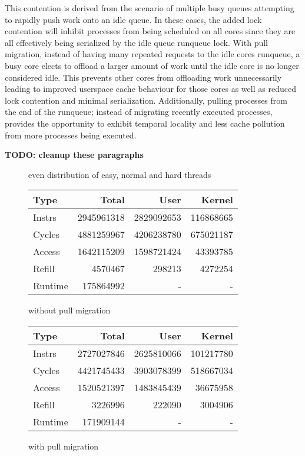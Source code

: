\documentclass[11pt]{article}
\begin{document}
This contention is derived from the scenario of multiple busy queues attempting to rapidly push work onto an idle queue.  In these cases, the added lock contention will inhibit processes from being scheduled on all cores since they are all effectively being serialized by the idle queue runqueue lock.  With pull migration, instead of having many repeated requests to the idle cores runqueue, a busy core elects to offload a larger amount of work until the idle core is no longer considered idle.  This prevents other cores from offloading work unnecessarily leading to improved userspace cache behaviour for those cores as well as reduced lock contention and minimal serialization.  Additionally, pulling processes from the end of the runqueue; instead of migrating recently executed processes, provides the opportunity to exhibit temporal locality and less cache pollution from more processes being executed. 

\textbf{TODO: cleanup these paragraphs}

\begin{figure*}[h]
	\caption{even distribution of easy, normal and hard threads}
	\centering
	\begin{subtable}[b]{.48\linewidth}
		\centering                 
		\begin{tabular}{ l|rrr }
			Type    & Total      & User       & Kernel    \\
			\hline
			Instrs  & 2945961318 & 2829092653 & 116868665 \\ 
			Cycles  & 4881259967 & 4206238780 & 675021187 \\ 
			Access  & 1642115209 & 1598721424 & 43393785  \\ 
			Refill  & 4570467    & 298213     & 4272254   \\ 
			Runtime & 175864992  & -          & -         \\
			\hline
		\end{tabular}
		\caption{without pull migration}    
	\end{subtable}
	\hfill
	\begin{subtable}[b]{.48\linewidth}
		\centering
		\begin{tabular}{ l|rrr }
			Type    & Total      & User       & Kernel    \\
			\hline
			Instrs  & 2727027846 & 2625810066 & 101217780 \\ 
			Cycles  & 4421745433 & 3903078399 & 518667034 \\ 
			Access  & 1520521397 & 1483845439 & 36675958  \\ 
			Refill  & 3226996    & 222090     & 3004906   \\ 
			Runtime & 171909144  & -          & -         \\
			\hline
		\end{tabular}
		\caption{with pull migration}
	\end{subtable}
\end{figure*}
\end{document}
